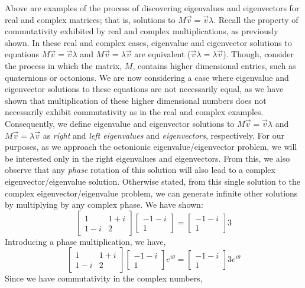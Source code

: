 \documentclass{article}
\theoremstyle{plain}
\begin{document}
Above are examples of the process of discovering eigenvalues and eigenvectors for real and complex matrices; that is, solutions to  $M\vec{v}=\vec{v}\lambda$. Recall the property of commutativity exhibited by real and complex multiplications, as previously shown. In these real and complex cases, eigenvalue and eigenvector solutions to equations $M\vec{v}=\vec{v}\lambda$ and $M\vec{v}=\lambda\vec{v}$ are equivalent ($\vec{v}\lambda=\lambda\vec{v}$). Though, consider the process in which the matrix, $M$, contains higher dimensional entries, such as quaternions or octonions. We are now considering a case where eigenvalue and eigenvector solutions to these equations are not necessarily equal, as we have shown that multiplication of these higher dimensional numbers does not necessarily exhibit commutativity as in the real and complex examples. Consequently, we define eigenvalue and eigenvector solutions to $M\vec{v}=\vec{v}\lambda$ and $M\vec{v}=\lambda\vec{v}$ as \emph{right} and \emph{left eigenvalues} and \emph{eigenvectors}, respectively. For our purposes, as we approach the octonionic eigenvalue/eigenvector problem, we will be interested only in the right eigenvalues and eigenvectors. From this, we also observe that any \emph{phase} rotation of this solution will also lead to a complex eigenvector/eigenvalue solution. Otherwise stated, from this single solution to the complex eigenvector/eigenvalue problem, we can generate infinite other solutions by multiplying by any complex phase. We have shown:
$$\begin{bmatrix}1 & 1+i\\1-i & 2\end{bmatrix}\begin{bmatrix}-1-i\\1\end{bmatrix}=\begin{bmatrix}-1-i\\1\end{bmatrix}3$$
Introducing a phase multiplication, we have,
$$\begin{bmatrix}1 & 1+i\\1-i & 2\end{bmatrix}\begin{bmatrix}-1-i\\1\end{bmatrix}e^{i\theta}=\begin{bmatrix}-1-i\\1\end{bmatrix}3e^{i\theta}$$
Since we have commutativity in the complex numbers,
\end{document}
